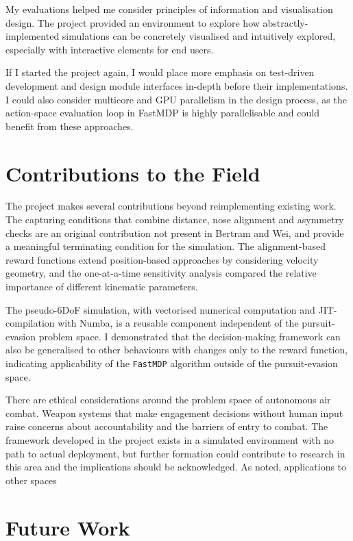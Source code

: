 My evaluations helped me consider principles of information and visualisation design. The project provided an environment to explore how abstractly-implemented simulations can be concretely visualised and intuitively explored, especially with interactive elements for end users. 

If I started the project again, I would place more emphasis on test-driven development and design module interfaces in-depth before their implementations. I could also consider multicore and GPU parallelism in the design process, as the action-space evaluation loop in FastMDP is highly parallelisable and could benefit from these approaches.

\section{Contributions to the Field}
\label{sec:5.3}

The project makes several contributions beyond reimplementing existing work. The capturing conditions that combine distance, nose alignment and asymmetry checks are an original contribution not present in Bertram and Wei\cite{bertram3d}, and provide a meaningful terminating condition for the simulation. The alignment-based reward functions extend position-based approaches by considering velocity geometry, and the one-at-a-time sensitivity analysis compared the relative importance of different kinematic parameters.

The pseudo-6DoF simulation, with vectorised numerical computation and JIT-compilation with Numba, is a reusable component independent of the pursuit-evasion problem space. I demonstrated that the decision-making framework can also be generalised to other behaviours with changes only to the reward function, indicating applicability of the \texttt{FastMDP} algorithm outside of the pursuit-evasion space.  

There are ethical considerations around the problem space of autonomous air combat. Weapon systems that make engagement decisions without human input raise concerns about accountability and the barriers of entry to combat. The framework developed in the project exists in a simulated environment with no path to actual deployment, but further formation could contribute to research in this area and the implications should be acknowledged. As noted, applications to other spaces 

\section{Future Work}
\label{sec:5.4}

